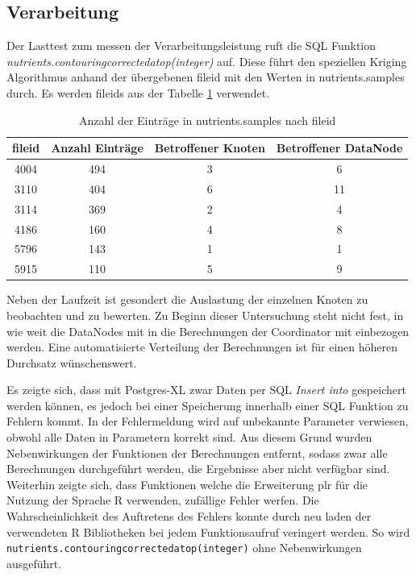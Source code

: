 \subsection{Verarbeitung}
Der Lasttest zum messen der Verarbeitungsleistung ruft die SQL Funktion\\
\textit{nutrients.contouringcorrectedatop(integer)} auf.
Diese führt den speziellen Kriging Algorithmus anhand der übergebenen fileid mit den Werten in nutrients.samples durch.
Es werden fileids aus der Tabelle \ref{tbl:entrysnsamples} verwendet.
\begin{table}[h!]
\centering
\begin{tabular}{c|c|c|c}
\textbf{fileid} & \textbf{Anzahl Einträge} & \textbf{Betroffener Knoten} & \textbf{Betroffener DataNode} \\ \hline
4004 & 494 & 3 & 6 \\ \hline	%
3110 & 404 & 6 & 11 \\ \hline	%
3114 & 369 & 2 & 4 \\ \hline	%
4186 & 160 & 4 & 8 \\ \hline	%
5796 & 143 & 1 & 1 \\ \hline	%
5915 & 110 & 5 & 9 \\ %
\end{tabular}
\caption{Anzahl der Einträge in nutrients.samples nach fileid}
\label{tbl:entrysnsamples}
\end{table}	%
Neben der Laufzeit ist gesondert die Auslastung der einzelnen Knoten zu beobachten und zu bewerten.
Zu Beginn dieser Untersuchung steht nicht fest, in wie weit die DataNodes mit in die Berechnungen der Coordinator mit einbezogen werden.
Eine automatisierte Verteilung der Berechnungen ist für einen höheren Durchsatz wünschenswert.

Es zeigte sich, dass mit Postgres-XL zwar Daten per SQL \textit{Insert into} gespeichert werden können, es jedoch bei einer Speicherung innerhalb einer SQL Funktion zu Fehlern kommt.
In der Fehlermeldung wird auf unbekannte Parameter verwiesen, obwohl alle Daten in Parametern korrekt sind.
Aus diesem Grund wurden Nebenwirkungen der Funktionen der Berechnungen entfernt, sodass zwar alle Berechnungen durchgeführt werden, die Ergebnisse aber nicht verfügbar sind.
Weiterhin zeigte sich, dass Funktionen welche die Erweiterung plr für die Nutzung der Sprache R verwenden, zufällige Fehler werfen.
Die Wahrscheinlichkeit des Auftretens des Fehlers konnte durch neu laden der verwendeten R Bibliotheken bei jedem Funktionsaufruf veringert werden.
So wird\\\verb+nutrients.contouringcorrectedatop(integer)+ ohne Nebenwirkungen ausgeführt.

